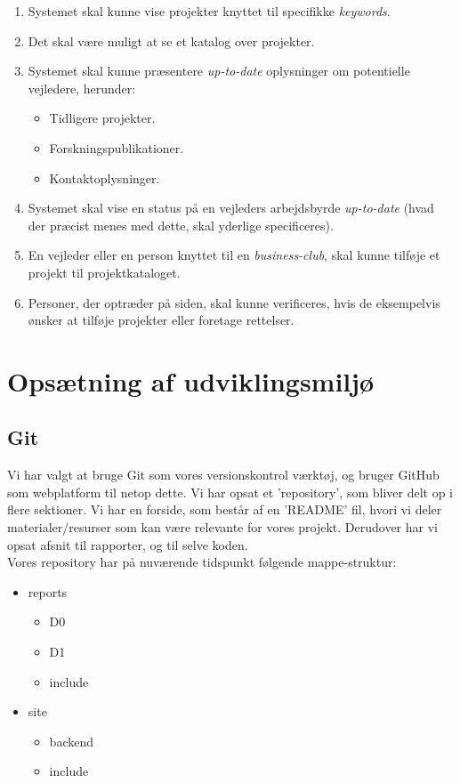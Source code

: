 \documentclass[11pt]{article}
\begin{document}
\begin{enumerate}
  \item Systemet skal kunne vise projekter knyttet til specifikke \textit{keywords}.
  \item Det skal være muligt at se et katalog over projekter.
  \item Systemet skal kunne præsentere \textit{up-to-date} oplysninger om potentielle vejledere, herunder:
  \begin{itemize}
    \item Tidligere projekter.
    \item Forskningspublikationer.
    \item Kontaktoplysninger.
  \end{itemize}
  \item Systemet skal vise en status på en vejleders arbejdsbyrde \textit{up-to-date} (hvad der præcist menes med dette, skal yderlige specificeres).
  \item En vejleder eller en person knyttet til en \textit{business-club}, skal kunne tilføje et projekt til projektkataloget.
  \item Personer, der optræder på siden, skal kunne verificeres, hvis de eksempelvis ønsker at tilføje projekter eller foretage rettelser.
\end{enumerate}

\section{Opsætning af udviklingsmiljø}
\subsection{Git}
Vi har valgt at bruge Git som vores versionskontrol værktøj, og bruger GitHub som webplatform til netop dette.
Vi har opsat et 'repository', som bliver delt op i flere sektioner. Vi har en forside, som består af en 'README' fil, hvori vi deler materialer/resurser som kan være relevante for vores projekt.
Derudover har vi opsat afsnit til rapporter, og til selve koden. \\
Vores repository har på nuværende tidspunkt følgende mappe-struktur:
\begin{itemize}
\item reports
  \begin{itemize}
  \item D0
  \item D1
  \item include
  \end{itemize}
\item site
  \begin{itemize}
  \item backend
  \item include
  \end{itemize}
\end{itemize}
\end{document}
